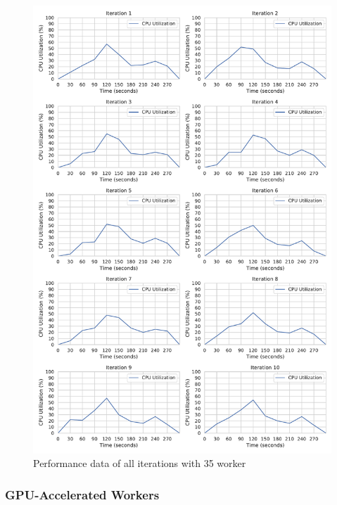 \begin{figure}[h]
\centering
\includegraphics[scale=0.4]{images/07_evaluation/regression/35_worker_cpu_performance}
\caption{Performance data of all iterations with 35 worker}
\label{fig:appendix_eval_regression_static35}
\end{figure}

\subsubsection{GPU-Accelerated Workers}

